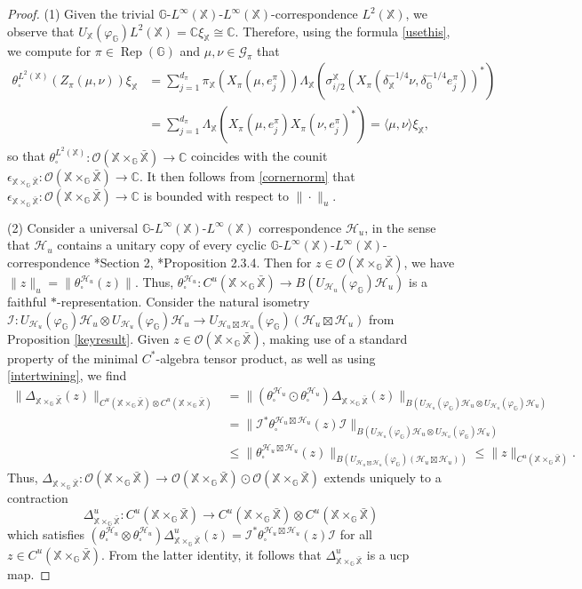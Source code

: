 \documentclass[reqno]{amsart}
\numberwithin{equation}{section}
\newcommand\XGX{\X\times_\G \bar{\X}}
\DeclareMathOperator{\Rep}{\mathrm{Rep}}
\newcommand{\mcG}{\mathcal{G}}
\newcommand{\mcH}{\mathcal{H}}
\newcommand{\mcO}{\mathcal{O}}
\newcommand{\C}{\mathbb{C}}
\newcommand{\G}{\mathbb{G}}
\newcommand{\X}{\mathbb{X}}
\begin{document}
 
 \begin{proof} (1) Given the trivial $\G$-$L^\infty(\X)$-$L^\infty(\X)$-correspondence $L^2(\X)$, we observe that $U_\X(\varphi_\G)L^2(\X)= \C \xi_\X\cong \C$. Therefore, using the formula \eqref{usethis}, we compute for $\pi \in \Rep(\G)$ and $\mu, \nu \in \mcG_\pi$ that
\begin{align*}
    \theta_\square^{L^2(\X)}(Z_\pi(\mu, \nu)) \xi_\X &= \sum_{j=1}^{d_\pi} \pi_\X(X_\pi(\mu, e_j^\pi)) \Lambda_\X(\sigma_{i/2}^\X(X_\pi(\delta_\X^{-1/4}\nu, \delta_\G^{-1/4}e_j^\pi))^*)\\
    &= \sum_{j=1}^{d_\pi} \Lambda_\X(X_\pi(\mu, e_j^\pi)X_\pi(\nu, e_j^\pi)^*) = \langle \mu, \nu\rangle \xi_\X,
\end{align*}
so that 
$\theta_\square^{L^2(\X)}: \mcO(\XGX)\to \C$ coincides with the counit $\epsilon_{\XGX}: \mcO(\XGX)\to \C$. It then follows from \eqref{cornernorm} that $\epsilon_{\XGX}: \mcO(\XGX)\to \C$ is bounded with respect to $\|\cdot\|_u$.
 
 (2) Consider a universal $\G$-$L^\infty(\X)$-$L^\infty(\X)$ correspondence $\mcH_u$, in the sense that $\mcH_u$ contains a unitary copy of every cyclic $\G$-$L^\infty(\X)$-$L^\infty(\X)$-correspondence \cite{DCDR24}*{Section 2}, \cite{DR25d}*{Proposition 2.3.4}. Then for $z\in \mcO(\XGX)$, we have $\|z\|_u = \|\theta^{\mcH_u}_\square(z)\|$. Thus, $\theta_\square^{\mcH_u}: C^u(\XGX)\to B(U_{\mcH_u}(\varphi_\G)\mcH_u)$ is a faithful $*$-representation. Consider the natural isometry $\mathcal{I}: U_{\mcH_u}(\varphi_\G)\mcH_u\otimes U_{\mcH_u}(\varphi_\G)\mcH_u\to U_{\mcH_u\boxtimes  \mcH_u}(\varphi_\G)(\mcH_u\boxtimes \mcH_u)$ from Proposition \ref{keyresult}. Given $z\in \mcO(\XGX)$, making use of a standard property of the minimal $C^*$-algebra tensor product, as well as using \eqref{intertwining}, we find
     \begin{align*}
         \|\Delta_{\XGX}(z)\|_{C^u(\XGX)\otimes C^u(\XGX)}&=\|(\theta_{\square}^{\mcH_u}\odot \theta_\square^{\mcH_u})\Delta_{\XGX}(z)\|_{B(U_{\mcH_u}(\varphi_\G)\mcH_u\otimes U_{\mcH_u}(\varphi_\G)\mcH_u)}\\
         &= \|\mathcal{I}^* \theta_\square^{\mcH_u\boxtimes \mcH_u}(z)\mathcal{I}\|_{B(U_{\mcH_u}(\varphi_\G)\mcH_u\otimes U_{\mcH_u}(\varphi_\G)\mcH_u)}\\
         &\le \|\theta_\square^{\mcH_u\boxtimes \mcH_u}(z)\|_{B(U_{\mcH_u\boxtimes \mcH_u}(\varphi_\G)(\mcH_u\boxtimes \mcH_u))} \le \|z\|_{C^u(\XGX)}.
         \end{align*}
Thus, $\Delta_{\XGX}: \mcO(\XGX)\to \mcO(\XGX)\odot \mcO(\XGX)$ extends uniquely to a contraction
$$\Delta_{\XGX}^u: C^u(\XGX)\to C^u(\XGX)\otimes C^u(\XGX)$$
which satisfies
$(\theta_\square^{\mcH_u}\otimes \theta_{\square}^{\mcH_u})\Delta_{\XGX}^u(z) = \mathcal{I}^*\theta_\square^{\mcH_u\boxtimes \mcH_u}(z)\mathcal{I}$ for all $z\in C^u(\XGX)$. From the latter identity, it follows that $\Delta_{\XGX}^u$ is a ucp map.


\end{proof}
\end{document}
